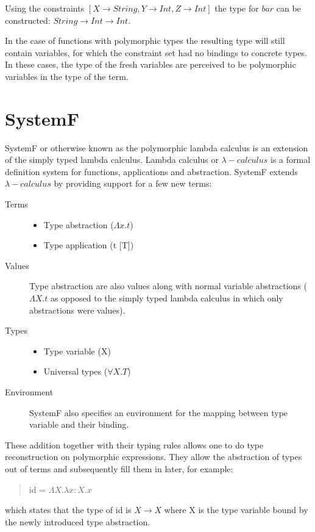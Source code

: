 \documentclass[twoside, titlepage, openright, a4paper]{book}
\newcommand{\Conid}[1]{\mathit{#1}}
\newcommand{\Varid}[1]{\mathit{#1}}
\newcommand{\ba}[1]{$[#1]$}
\begin{document}
Using the constraints {\ba{X\rightarrow String, Y\rightarrow Int, Z\rightarrow Int}} the type for \ensuremath{\Varid{bar}} can be constructed: \ensuremath{\Conid{String}\to \Conid{Int}\to \Conid{Int}}.

In the case of functions with polymorphic types the resulting type will still contain variables, for which the constraint set had no bindings to concrete types. In these cases, the type of the fresh variables are perceived to be polymorphic variables in the type of the term.

\section{SystemF}
SystemF or otherwise known as the polymorphic lambda calculus is an extension of the simply typed lambda calculus. Lambda calculus or $\lambda-calculus$  is a formal definition system for functions, applications and abstraction. SystemF extends $\lambda-calculus$ by providing support for a few new terms:

\begin{description}
\item[Terms]{
	\begin{minipage}[t]{\linewidth}
		\begin{itemize}
			\item Type abstraction ($\Lambda x.t$)
			\item Type application (t [T])
		\end{itemize}
	\end{minipage}
}
\item[Values] Type abstraction are also values along with normal variable abstractions ($\Lambda X.t$ as opposed to the simply typed lambda calculus in which only abstractions were values).
\item[Types]{ 
	\begin{minipage}[t]{\linewidth}
		\begin{itemize}
			\item Type variable (X)
			\item Universal types ($\forall X. T$)
		\end{itemize}
	\end{minipage}
}
\item[Environment] SystemF also specifies an environment for the mapping between type variable and their binding.
\end{description}

These addition together with their typing rules allows one to do type reconstruction on polymorphic expressions. They allow the abstraction of types out of terms and subsequently fill them in later, for example:
\begin{quotation}
id = $\Lambda X.\lambda x:X. x$
\end{quotation}
which states that the type of id is $X \rightarrow X$ where X is the type variable bound by the newly introduced type abstraction. 
\end{document}
